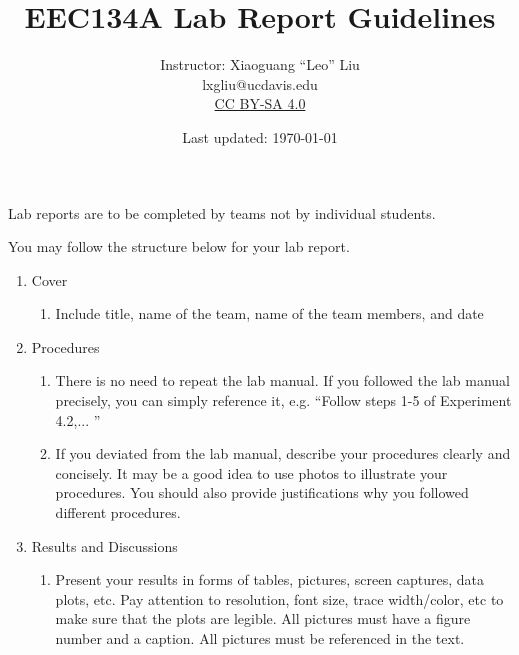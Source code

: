 \documentclass[letterpaper, 11pt]{article}
\title{EEC134A Lab Report Guidelines}
\author{Instructor: Xiaoguang ``Leo'' Liu \\ lxgliu@ucdavis.edu \\ \small \href{http://creativecommons.org/licenses/by-sa/4.0/}{CC BY-SA 4.0}}
\date{Last updated: \today}
\begin{document}
\maketitle

Lab reports are to be completed by teams not by individual students. 

You may follow the structure below for your lab report. 

\begin{enumerate}
	\item Cover
		\begin{enumerate}
			\item Include title, name of the team, name of the team members, and date 
		\end{enumerate}
	\item Procedures
		\begin{enumerate}
			\item There is no need to repeat the lab manual. If you followed the lab manual precisely, you can simply reference it, e.g. ``Follow steps 1-5 of Experiment 4.2,... ''
			
			\item If you deviated from the lab manual, describe your procedures clearly and concisely. It may be a good idea to use photos to illustrate your procedures. You should also provide justifications why you followed different procedures. 
		\end{enumerate}
	\item Results and Discussions
		\begin{enumerate}
			\item Present your results in forms of tables, pictures, screen captures, data plots, etc. Pay attention to resolution, font size, trace width/color, etc to make sure that the plots are legible. All pictures must have a figure number and a caption. All pictures must be referenced in the text.
			

\end{enumerate}
\end{enumerate}
\end{document}
